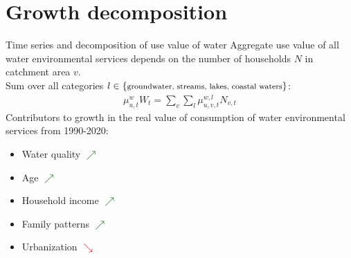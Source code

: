 \section{Growth decomposition}

\begin{frame}{Time series and decomposition of use value of water}
  Aggregate use value of all water environmental services depends on the number of households $N$ in catchment area $v$.\\\medskip
  Sum over all categories $\footnotesize l\in\{\text{groundwater, streams, lakes, coastal waters}\}$:
  \begin{align*}
    \mu_{u,t}^{w}W_t=\sum_v\sum_l\mu_{u,v,t}^{w,l}N_{v,t}
  \end{align*}
  \pause
  Contributors to growth in the real value of consumption of water environmental services from 1990-2020:
  \begin{itemize}
    \item Water quality \textcolor{darkgreen}{$\nearrow$}
    \item Age \textcolor{darkgreen}{$\nearrow$}
    \item Household income \textcolor{darkgreen}{$\nearrow$}
    \item Family patterns \textcolor{darkgreen}{$\nearrow$}
    \item Urbanization \textcolor{red}{$\searrow$}
  \end{itemize}
\end{frame}